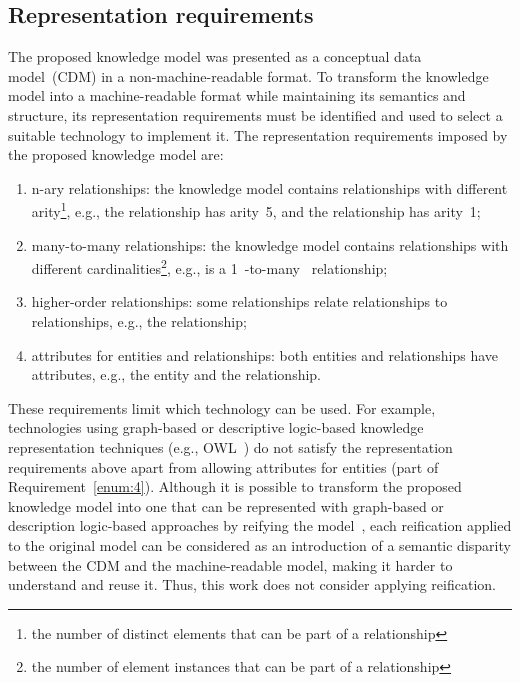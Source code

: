 \subsection{Representation requirements}\label{sec:rosa:rep_req}
The proposed knowledge model was presented as a conceptual data model~(CDM) in a non-machine-readable format. To transform the knowledge model into a machine-readable format while maintaining its semantics and structure, its representation requirements must be identified and used to select a suitable technology to implement it. The representation requirements imposed by the proposed knowledge model are:
\begin{enumerate}
    \item n-ary relationships: the knowledge model contains relationships with different arity\footnote{the number of distinct elements that can be part of a relationship}, e.g., the  relationship has arity~5, and the  relationship has arity~1;
    \item many-to-many relationships: the knowledge model contains relationships with different cardinalities\footnote{the number of element instances that can be part of a relationship}, e.g.,  is a 1~-to-many~ relationship;
    \item\label{enum:3} higher-order relationships: some relationships relate relationships to relationships, e.g., the  relationship;
    \item\label{enum:4} attributes for entities and relationships: both entities and relationships have attributes, e.g., the  entity and the  relationship.
\end{enumerate}


These requirements limit which technology can be used. For example, technologies using graph-based or descriptive logic-based knowledge representation techniques (e.g., OWL~\citep{Antoniou2004}) do not satisfy the representation requirements above apart from allowing attributes for entities (part of Requirement~\ref{enum:4}). Although it is possible to transform the proposed knowledge model into one that can be represented with graph-based or description logic-based approaches by reifying the model~\citep{olive2007conceptual}, each reification applied to the original model can be considered as an introduction of a semantic disparity between the CDM and the machine-readable model, making it harder to understand and reuse it. Thus, this work does not consider applying reification.

